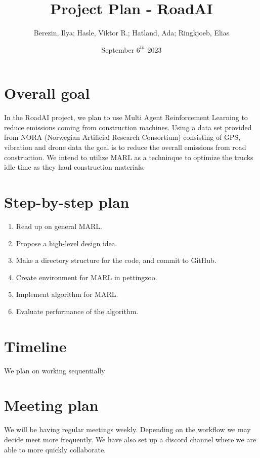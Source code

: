 \documentclass{article}
\title{Project Plan - RoadAI}
\author{Berezin, Ilya; Hasle, Viktor R.; Hatland, Ada; Ringkjoeb, Elias}
\date{September $6^{th}$ 2023}
\begin{document}
\begin{titlepage}
\maketitle
\tableofcontents
\end{titlepage}


\section{Overall goal}
In the RoadAI project, we plan to use Multi Agent Reinforcement Learning to reduce emissions coming from
construction machines. Using a data set provided from NORA (Norwegian Artificial Research Consortium) consisting of GPS, vibration and drone data 
the goal is to reduce the overall emissions from road construction. We intend to utilize MARL as a techninque to optimize 
the trucks idle time as they haul construction materials.

\section{Step-by-step plan}
\begin{enumerate}
  \item Read up on general MARL.\\
  \item Propose a high-level design idea.\\
  \item Make a directory structure for the code, and commit to GitHub.\\
  \item Create environment for MARL in pettingzoo.\\
  \item Implement algorithm for MARL. \\
  \item Evaluate performance of the algorithm.
\end{enumerate}

\section{Timeline}
We plan on working sequentially 
\section{Meeting plan}
We will be having regular meetings weekly. Depending on the workflow we may decide meet more frequently.
We have also set up a discord channel where we are able to more quickly collaborate.
\end{document}
